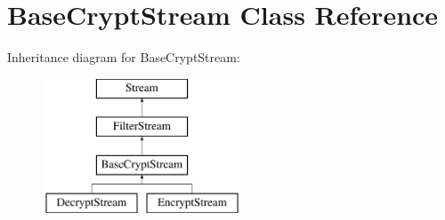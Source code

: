 \hypertarget{class_base_crypt_stream}{}\section{Base\+Crypt\+Stream Class Reference}
\label{class_base_crypt_stream}
Inheritance diagram for Base\+Crypt\+Stream\+:\begin{figure}[H]
\begin{center}
\leavevmode
\includegraphics[height=4.000000cm]{class_base_crypt_stream}
\end{center}
\end{figure}
